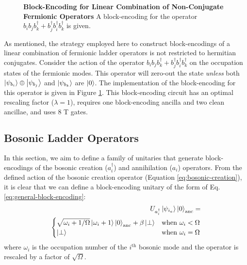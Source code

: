 \begin{figure}
    
    \caption{
        \textbf{Block-Encoding for Linear Combination of Non-Conjugate Fermionic Operators}
        A block-encoding for the operator $b_i b_j b_k^\dagger + b_j^\dagger b_i^\dagger b_k^\dagger$ is given.
    }
    \label{fig:fermionic-be-lc-not-conjugate}
\end{figure}

As mentioned, the strategy employed here to construct block-encodings of a linear combination of fermionic ladder operators is not restricted to hermitian conjugates.
Consider the action of the operator $b_i b_j b_k^\dagger + b_j^\dagger b_i^\dagger b_k^\dagger$ on the occupation states of the fermionic modes.
This operator will zero-out the state \textit{unless} both $\ket{\psi_{b_i}} \oplus \ket{\psi_{b_j}}$ and $\ket{\psi_{b_k}}$ are $\ket{0}$.
The implementation of the block-encoding for this operator is given in Figure \ref{fig:fermionic-be-lc-not-conjugate}.
This block-encoding circuit has an optimal rescaling factor ($\lambda = 1$), requires one block-encoding ancilla and two clean ancillae, and uses $8$ T gates.

\subsection{Bosonic Ladder Operators}

In this section, we aim to define a family of unitaries that generate block-encodings of the bosonic creation ($a_i^\dagger$) and annihilation ($a_i$) operators.
From the defined action of the bosonic creation operator (Equation \ref{eq:bosonic-creation}), it is clear that we can define a block-encoding unitary of the form of Eq. \ref{eq:general-block-encoding}: 
\begin{equation}
    \label{eq:be-bos-creation}
    \begin{split}
        U_{a^\dagger_i} \ket{\psi_{i_a}} \ket{0}_\text{anc} = \\
        \begin{cases}
            \sqrt{\omega_i + 1 / \Omega} \ket{\omega_i + 1} \ket{0}_\text{anc} + \beta \ket{\perp} & \text{when } \omega_i < \Omega \\
            \ket{\perp} & \text{when } \omega_i = \Omega \\
        \end{cases}
    \end{split}
\end{equation}
where $\omega_i$ is the occupation number of the $i^\text{th}$ bosonic mode and the operator is rescaled by a factor of $\sqrt{\Omega}$.

